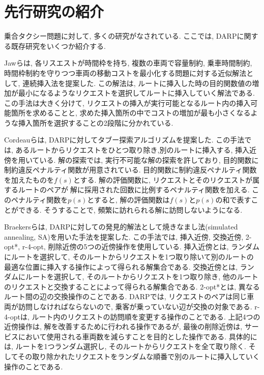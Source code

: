 \chapter{先行研究の紹介}\label{previous_research}
乗合タクシー問題に対して, 多くの研究がなされている. ここでは, DARPに関する既存研究をいくつか紹介する.

Jawらは, 各リスエストが時間枠を持ち, 複数の車両で容量制約, 乗車時間制約, 時間枠制約を守りつつ車両の移動コストを最小化する問題に対する近似解法として, 連続挿入法を提案した\cite{insertion}. この解法は, ルートに挿入した時の目的関数値の増加が最小になるようなリクエストを選択してルートに挿入していく解法である. この手法は大きく分けて, リクエストの挿入が実行可能となるルート内の挿入可能箇所を求めることと, 求めた挿入箇所の中でコストの増加が最も小さくなるような挿入箇所を選択することの2段階に分かれている.

Cordeauらは, DARPに対してタブー探索アルゴリズムを提案した\cite{tabu}. この手法では, あるルートからリクエストをひとつ取り除き,別のルートに挿入する, 挿入近傍を用いている. 解の探索では, 実行不可能な解の探索を許しており, 目的関数に制約違反ペナルティ関数が用意されている. 目的関数に制約違反ペナルティ関数を加えたものを$f(s)$とする. 解の評価関数に, リクエストとそのリクエストが属するルートのペアが解に採用された回数に比例するペナルティ関数を加える. このペナルティ関数を$p(s)$とすると, 解の評価関数は$f(s)とp(s)$の和で表すことができる. そうすることで, 頻繁に訪れられる解に訪問しないようになる. 

Braekersらは, DARPに対しての発見的解法として焼きなまし法(simulated annealing, SA)を用いた手法を提案した\cite{SA}. この手法では, 挿入近傍, 交換近傍, 2-opt*, r-4-opt, 削除近傍の5つの近傍操作を使用している.
挿入近傍とは, ランダムにルートを選択して, そのルートからリクエストを1つ取り除いて別のルートの最適な位置に挿入する操作によって得られる解集合である.
交換近傍とは, ランダムにルートを選択して, そのルートからリクエストを1つ取り除き, 他のルートのリクエストと交換することによって得られる解集合である.
2-opt*とは, 異なるルート間の辺の交換操作のことである.  DARPでは, リクエストのペアは同じ車両が訪問しなければならないので, 乗客が乗っていない辺が交換の対象である.
r-4-optは, ルート内のリクエストの訪問順を変更する操作のことである.
上記4つの近傍操作は, 解を改善するために行われる操作であるが, 最後の削除近傍は, サービスにおいて使用される車両数を減らすことを目的とした操作である. 具体的には, ルートを1つランダム選択し, そのルートからリクエストを全て取り除く. そしてその取り除かれたリクエストをランダムな順番で別のルートに挿入していく操作のことである.

